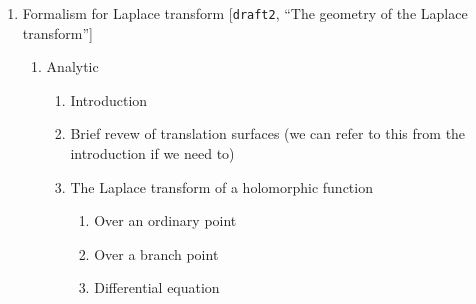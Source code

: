 \documentclass{article}
\begin{document}
\begin{enumerate}
\begin{itemize}
\begin{itemize}
\end{itemize}
\item what are exponential integrals? \textcolor{gray}{has to be done}
\begin{itemize}
\item motivation
\begin{itemize}
\item In the classical theory of special functions, exponential integrals are often used to express solutions of linear differential and difference equations.
\item In physics ??
\item Geometrically they represent a Poincar\'e pairing (as explained by Kontsevich in \textbf{IHES lectures}).
\end{itemize}
\end{itemize}
\item What is the class of ODEs that we study? \textcolor{gray}{has to be done}
\item State results about resurgence of exponential integrals and Stokes phenomena
\begin{itemize}
\item Thimbles integrals [Kontsevich]: geometric computation of Stokes constants \textcolor{gray}{has to be done}
\item ODE and fractional derivative formula [{\tt draft2}]
\item if hypergeometric functions appear in a large class of examples: integral formulas for hypergeometric functions \textcolor{gray}{has to be done}
\end{itemize}
\end{itemize}
\item Formalism for Laplace transform [{\tt draft2}, ``The geometry of the Laplace transform'']
\begin{enumerate}
\item Analytic
\begin{enumerate}
\item Introduction
\item Brief revew of translation surfaces (we can refer to this from the introduction if we need to)
\item The Laplace transform of a holomorphic function
\begin{enumerate}
\item Over an ordinary point
\item Over a branch point
\item Differential equation
\end{enumerate}

\end{enumerate}
\end{enumerate}
\end{enumerate}
\end{document}
